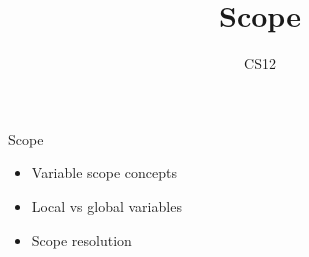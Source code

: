 \documentclass{beamer}
\title{Scope}
\author{CS12}
\date{}
\begin{document}
\begin{frame}
    \titlepage
\end{frame}

\begin{frame}{Scope}
    \begin{itemize}
        \item Variable scope concepts
        \item Local vs global variables
        \item Scope resolution
    \end{itemize}
\end{frame}
\end{document}

